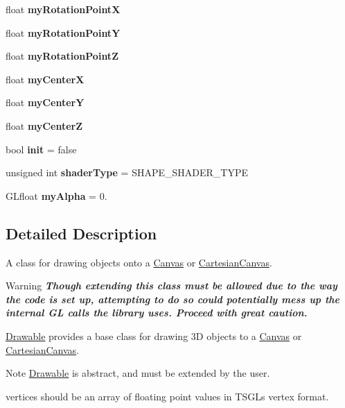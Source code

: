 \begin{DoxyCompactItemize}
float {\bfseries my\+Rotation\+PointX}
\item 
\mbox{\label{classtsgl_1_1_drawable_afc85968c03eb68cdc3a1648986d4539f}} 
float {\bfseries my\+Rotation\+PointY}
\item 
\mbox{\label{classtsgl_1_1_drawable_ab18192d302c84c302ad4fa55248c1064}} 
float {\bfseries my\+Rotation\+PointZ}
\item 
\mbox{\label{classtsgl_1_1_drawable_a2c45b9c3f4a2afba4270aa9f40eb82de}} 
float {\bfseries my\+CenterX}
\item 
\mbox{\label{classtsgl_1_1_drawable_a1d8726633a9303ca13530e8973662aff}} 
float {\bfseries my\+CenterY}
\item 
\mbox{\label{classtsgl_1_1_drawable_a59cf4ffb4550796ca2d2d1e29345b8de}} 
float {\bfseries my\+CenterZ}
\item 
\mbox{\label{classtsgl_1_1_drawable_a3dd25b680812efbc48e4340cff5e6c67}} 
bool {\bfseries init} = false
\item 
\mbox{\label{classtsgl_1_1_drawable_a4983a31b4e53ff6fff025b7dd61ffdc8}} 
unsigned int {\bfseries shader\+Type} = S\+H\+A\+P\+E\+\_\+\+S\+H\+A\+D\+E\+R\+\_\+\+T\+Y\+PE
\item 
\mbox{\label{classtsgl_1_1_drawable_af54a92431f81300879dddc70e2673270}} 
G\+Lfloat {\bfseries my\+Alpha} = 0.
\end{DoxyCompactItemize}


\subsection{Detailed Description}
A class for drawing objects onto a \hyperlink{classtsgl_1_1_canvas}{Canvas} or \hyperlink{classtsgl_1_1_cartesian_canvas}{Cartesian\+Canvas}. 

\begin{DoxyWarning}{Warning}
{\bfseries {\itshape Though extending this class must be allowed due to the way the code is set up, attempting to do so could potentially mess up the internal GL calls the library uses. Proceed with great caution.}}
\end{DoxyWarning}
\hyperlink{classtsgl_1_1_drawable}{Drawable} provides a base class for drawing 3D objects to a \hyperlink{classtsgl_1_1_canvas}{Canvas} or \hyperlink{classtsgl_1_1_cartesian_canvas}{Cartesian\+Canvas}. \begin{DoxyNote}{Note}
\hyperlink{classtsgl_1_1_drawable}{Drawable} is abstract, and must be extended by the user.
\end{DoxyNote}
{\ttfamily vertices} should be an array of floating point values in T\+S\+GL\textquotesingle{}s vertex format.

